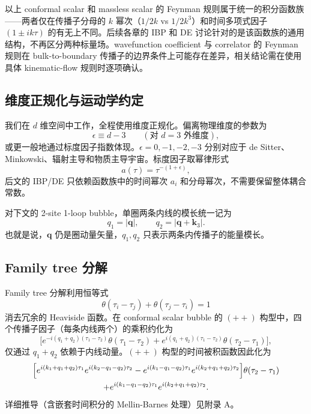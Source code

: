 ﻿\documentclass[a4paper,11pt]{article}
\begin{document}
以上 conformal scalar 和 massless scalar 的 Feynman 规则属于统一的积分函数族——两者仅在传播子分母的 $k$ 幂次（$1/2k$ vs $1/2k^3$）和时间多项式因子 $(1\pm ik\tau)$ 的有无上不同。后续各章的 IBP 和 DE 讨论针对的是该函数族的通用结构，不再区分两种标量场。wavefunction coefficient 与 correlator 的 Feynman 规则在 bulk-to-boundary 传播子的边界条件上可能存在差异，相关结论需在使用具体 kinematic-flow 规则时逐项确认。

\subsection{维度正规化与运动学约定}

我们在 $d$ 维空间中工作，全程使用维度正规化。偏离物理维度的参数为
\begin{equation}
    \epsilon\equiv d-3\qquad(\text{对 }d=3\text{ 外维度}),
\end{equation}
或更一般地通过标度因子指数体现。$\epsilon=0,-1,-2,-3$ 分别对应于 de Sitter、Minkowski、辐射主导和物质主导宇宙。标度因子取幂律形式
\begin{equation}
    a(\tau)=\tau^{-(1+\epsilon)},
\end{equation}
后文的 IBP/DE 只依赖函数族中的时间幂次 $a_i$ 和分母幂次，不需要保留整体耦合常数。

对下文的 2-site 1-loop bubble，单圈两条内线的模长统一记为
\begin{equation}
    q_1=|\boldsymbol{q}|,\qquad q_2=|\boldsymbol{q}+\boldsymbol{k}_3|.
    \label{qidef}
\end{equation}
也就是说，$\boldsymbol{q}$ 仍是圈动量矢量，$q_1,q_2$ 只表示两条内传播子的能量模长。

\subsection{Family tree 分解}

Family tree 分解利用恒等式
\begin{equation}
    \theta(\tau_i-\tau_j)+\theta(\tau_j-\tau_i)=1
\end{equation}
消去冗余的 Heaviside 函数。在 conformal scalar bubble 的 $(++)$ 构型中，四个传播子因子（每条内线两个）的乘积约化为
\begin{equation}
    \bigl[e^{-i(q_1+q_2)(\tau_1-\tau_2)}\theta(\tau_1-\tau_2)+e^{i(q_1+q_2)(\tau_1-\tau_2)}\theta(\tau_2-\tau_1)\bigr],
\end{equation}
仅通过 $q_1+q_2$ 依赖于内线动量。$(++)$ 构型的时间被积函数因此化为
\begin{multline}
    \Bigl[
    e^{i(k_1+q_1+q_2)\tau_1}
    e^{i(k_2-q_1-q_2)\tau_2}
    -e^{i(k_1-q_1-q_2)\tau_1}
    e^{i(k_2+q_1+q_2)\tau_2}
    \Bigr]\theta(\tau_2-\tau_1)\\
    +e^{i(k_1-q_1-q_2)\tau_1}
    e^{i(k_2+q_1+q_2)\tau_2}.
\end{multline}
详细推导（含嵌套时间积分的 Mellin-Barnes 处理）见附录 A。
\end{document}
